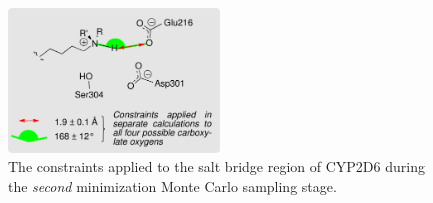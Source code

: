 \begin{figure}[hp]
\centering
\includegraphics[width=0.50\textwidth]{figures/idsite/salt_bridge_second}
\caption{The constraints applied to the salt bridge region of CYP2D6 during the {\it second} minimization Monte Carlo sampling stage.}
\label{figure:salt_bridge_second}
\end{figure}
